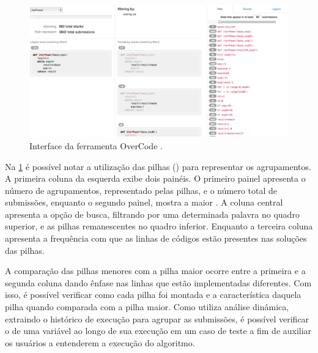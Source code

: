	    \begin{figure}[ht]
	        \centering
	        \includegraphics[scale=0.4]{imagem/overCode.png}
	        \captionsetup{justification=centering}
	        \caption{Interface da ferramenta OverCode \cite{Glassman:2015}.}
	        \label{fig:interfaceOverCode}
	    \end{figure}
	    
		Na \cref{fig:interfaceOverCode} é possível notar a utilização das pilhas
		() para representar os agrupamentos. A primeira coluna da
		esquerda exibe dois painéis. O primeiro painel apresenta o número de
		agrupamentos, representado pelas pilhas, e o número total de submissões,
		enquanto o segundo painel, mostra a maior . A coluna central
		apresenta a opção de busca, filtrando por uma determinada palavra no quadro
		superior, e as pilhas remanescentes no quadro inferior. Enquanto a terceira
		coluna apresenta a frequência com que as linhas de códigos estão presentes
		nas soluções das pilhas.

		A comparação das pilhas menores com a pilha maior ocorre entre a primeira e a
	    segunda coluna dando ênfase nas linhas que estão implementadas diferentes. Com
	    isso, é possível verificar como cada pilha foi montada e a característica daquela
	    pilha quando comparada com a pilha maior. Como utiliza análise dinâmica, extraindo
	    o histórico de execução para agrupar as submissões, é possível verificar o 
	    de uma variável ao longo de sua execução em um caso de teste a fim de auxiliar os
	    usuários a entenderem a execução do algoritmo.
	    

